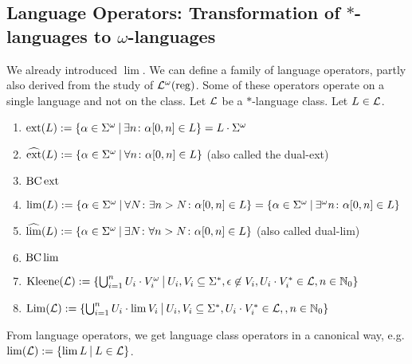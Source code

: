 
\subsection{Language Operators: Transformation of $*$-languages to $\omega$-languages}

We already introduced $\lim$. We can define a family of language operators, partly also derived from the study of $\mathcal{L}^\omega(\textup{\textrm{reg}})$. Some of these operators operate on a single language and not on the class. Let $\mathcal{L}$ be a $*$-language class. Let $L \in \mathcal{L}$.

\begin{enumerate}
\item $\ext(L) := \Set{\alpha \in \Sigma^\omega}{ \exists n \colon \alpha[0,n] \in L} = L \cdot \Sigma^\omega$
\item $\dext(L) := \Set{\alpha \in \Sigma^\omega}{ \forall n \colon \alpha[0,n] \in L}$ (also called the dual-ext)
\item $\operatorname{BC} \operatorname{ext}$
\item $\lim(L) := \Set{ \alpha \in \Sigma^\omega }{ \forall N \colon \exists n > N \colon \alpha[0,n] \in L } = \Set{ \alpha \in \Sigma^\omega }{ \exists^\omega n \colon \alpha[0,n] \in L }$
\item $\dlim(L) := \Set{ \alpha \in \Sigma^\omega }{ \exists N \colon \forall n > N \colon \alpha[0,n] \in L }$ (also called dual-lim)
\item $\operatorname{BC} \lim$
\item $\Kleene(\Lang) := \Set{ \bigcup_{i=1}^n U_i \cdot V_i^\omega}{U_i, V_i \subseteq \Sigma^*, \epsilon \not\in V_i, U_i \cdot V_i^* \in \Lang, n \in \N_0}$
\item $\limClosure(\Lang) := \Set{\bigcup_{i=1}^n U_i \cdot \lim V_i}{U_i, V_i \subseteq \Sigma^*, U_i \cdot V_i^* \in \Lang,, n \in \N_0}$
\end{enumerate}

From language operators, we get language class operators in a canonical way, e.g. $\lim(\Lang) := \Set{\lim L}{L \in \Lang}$.

